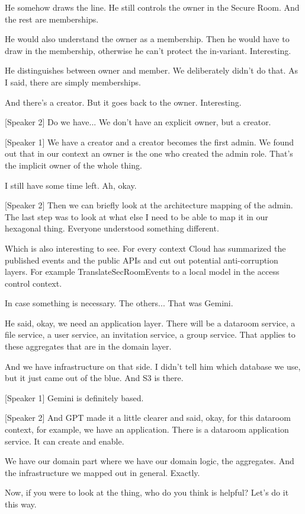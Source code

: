 He somehow draws the line. He still controls the owner in the Secure Room. And the rest are memberships.

He would also understand the owner as a membership. Then he would have to draw in the membership, otherwise he can't protect the in-variant. Interesting.

He distinguishes between owner and member. We deliberately didn't do that. As I said, there are simply memberships.

And there's a creator. But it goes back to the owner. Interesting.

[Speaker 2]
Do we have... We don't have an explicit owner, but a creator.

[Speaker 1]
We have a creator and a creator becomes the first admin. We found out that in our context an owner is the one who created the admin role. That's the implicit owner of the whole thing.

I still have some time left. Ah, okay.

[Speaker 2]
Then we can briefly look at the architecture mapping of the admin. The last step was to look at what else I need to be able to map it in our hexagonal thing. Everyone understood something different.

Which is also interesting to see. For every context Cloud has summarized the published events and the public APIs and cut out potential anti-corruption layers. For example TranslateSecRoomEvents to a local model in the access control context.

In case something is necessary. The others... That was Gemini.

He said, okay, we need an application layer. There will be a dataroom service, a file service, a user service, an invitation service, a group service. That applies to these aggregates that are in the domain layer.

And we have infrastructure on that side. I didn't tell him which database we use, but it just came out of the blue. And S3 is there.

[Speaker 1]
Gemini is definitely based.

[Speaker 2]
And GPT made it a little clearer and said, okay, for this dataroom context, for example, we have an application. There is a dataroom application service. It can create and enable.

We have our domain part where we have our domain logic, the aggregates. And the infrastructure we mapped out in general. Exactly.

Now, if you were to look at the thing, who do you think is helpful? Let's do it this way.

